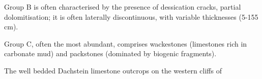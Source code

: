 Group B is often characterised by the presence of dessication cracks, partial dolomitisation; it is often laterally discontinuous, with variable thicknesses (5-155\,cm).

Group C, often the most abundant, comprises wackestones (limestones rich in carbonate mud) and packstones (dominated by biogenic fragments).

\begin{marginfigure}
\caption{The well bedded Dachstein limestone outcrops on the western cliffs of  }
\label{fig:dachstein}
\end{marginfigure}

